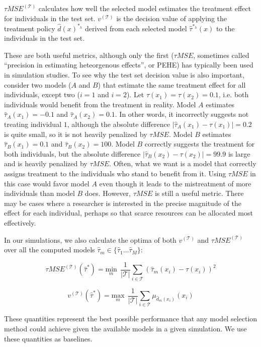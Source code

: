 $\tau MSE^{(\mathcal{T})}$ calculates how well the selected model estimates the treatment effect for individuals in the test set. $v^{(\mathcal{T})}$ is the decision value of applying the treatment policy $\hat d(x)^{*_h}$ derived from each selected model $\hat \tau^{*_h} (x)$ to the individuals in the test set.

These are both useful metrics, although only the first ($\tau MSE$, sometimes called ``precision in estimating heteorgenous effects'', or PEHE) has typically been used in simulation studies. To see why the test set decision value is also important, consider two models ($A$ and $B$) that estimate the same treatment effect for all individuals, except two ($i=1$ and $i=2$). Let $\tau(x_1) = \tau(x_2) = 0.1$, i.e. both individuals would benefit from the treatment in reality. Model $A$ estimates $\hat\tau_A(x_1) = -0.1$ and $\hat\tau_A(x_2) = 0.1$. In other words, it incorrectly suggests not treating individual $1$, although the absolute difference $|\hat\tau_A(x_1)-\tau(x_1)| = 0.2$ is quite small, so it is not heavily penalized by $\tau MSE$. Model $B$ estimates $\hat\tau_B(x_1) = 0.1$ and $\hat\tau_B(x_2) = 100$. Model $B$ correctly suggests the treatment for both individuals, but the absolute difference $|\hat\tau_B(x_2)-\tau(x_2)| = 99.9$ is large and is heavily penalized by $\tau MSE$. Often, what we want is a model that correctly assigns treatment to the individuals who stand to benefit from it. Using $\tau MSE$ in this case would favor model $A$ even though it leads to the mistreatment of more individuals than model $B$ does. However, $\tau MSE$ is still a useful metric. There may be cases where a researcher is interested in the precise magnitude of the effect for each individual, perhaps so that scarce resources can be allocated most effectively. 

In our simulations, we also calculate the optima of both $v^{(\mathcal{T})}$ and $\tau MSE^{(\mathcal{T})}$ over all the computed models $\hat\tau_m \in \{\hat\tau_1 \dots \hat\tau_M\}$:

\[
\tau MSE^{(\mathcal{T})}(\hat\tau^{*}) = \underset{m}{\text{min}} \ \ \frac{1}{|\mathcal{T}|}\sum_{i \in \mathcal{T}} (\hat\tau_m (x_i) - \tau(x_i))^2
\]

\[
v^{(\mathcal{T})}(\hat\tau^{*}) = \underset{m}{\text{max}} \ \ \frac{1}{|\mathcal{T}|}\sum_{i \in \mathcal{T}} \mu_{\hat d_m(x_i)}(x_i)
\]

These quantities represent the best possible performance that any model selection method could achieve given the available models in a given simulation. We use these quantities as baselines.


